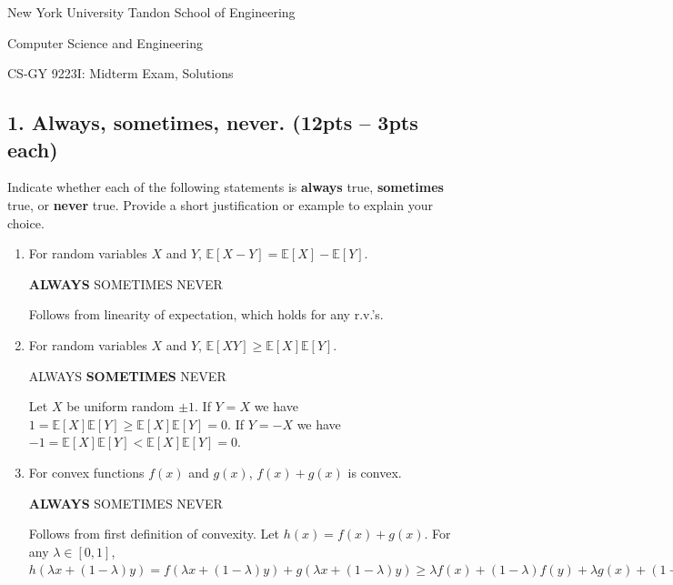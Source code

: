 \documentclass[10pt]{article}
\newcommand{\E}{\mathbb{E}}
\begin{document}
	
\begin{center}
	\normalsize
	New York University Tandon School of Engineering
	
	Computer Science and Engineering
	\medskip
	
	\large
	CS-GY 9223I: Midterm Exam, Solutions
	\medskip
\end{center}


\subsection{1. Always, sometimes, never. (\textbf{\small 12pts -- 3pts each})} 
Indicate whether each of the following statements is \textbf{always} true, \textbf{sometimes} true, or \textbf{never} true. Provide a short justification or example to explain your choice. 
\begin{enumerate}[label=(\alph*)]
	\item For random variables $X$ and $Y$, $\E[X - Y]  =  \E[X] - \E[Y]$. 
	
	\textbf{ALWAYS}\hspace{1em} SOMETIMES\hspace{1em} NEVER
	
	Follows from linearity of expectation, which holds for any r.v.'s.
	
	\item For random variables $X$ and $Y$, $\E[X Y]  \geq  \E[X]\E[Y]$. 
	
	ALWAYS\hspace{1em} \textbf{SOMETIMES}\hspace{1em} NEVER
	
	Let $X$ be uniform random $\pm 1$. If $Y = X$ we have $1 =  \E[X]\E[Y] \geq \E[X]\E[Y] = 0$. If $Y = -X$ we have $-1 =  \E[X]\E[Y] < \E[X]\E[Y] = 0$.
	
	\item For convex functions $f(x)$ and $g(x)$, $f(x) + g(x)$ is convex.
	
	\textbf{ALWAYS}\hspace{1em} SOMETIMES\hspace{1em} NEVER
	
	Follows from first definition of convexity. Let $h(x) = f(x) + g(x)$. For any $\lambda \in [0,1]$, $h(\lambda x + (1-\lambda) y) = f(\lambda x + (1-\lambda) y) + g(\lambda x + (1-\lambda) y) \geq \lambda f( x) + (1-\lambda)f(y)  + \lambda g( x) + (1-\lambda)g(y)  = \lambda h( x) + (1-\lambda)h(y). $
	

	
%	
	

\end{enumerate}
\end{document}
